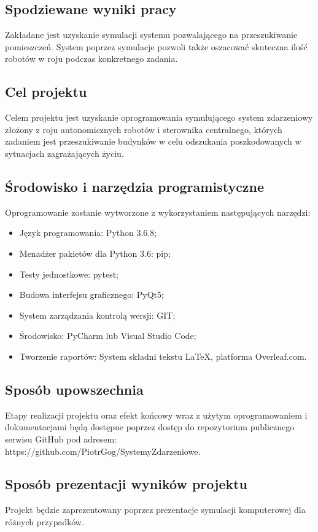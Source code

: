 \subsection{Spodziewane wyniki pracy} 
\label{subsec:spodziewane_wyniki_pracy}         
Zakładane jest uzyskanie symulacji systemu pozwalającego na przeszukiwanie pomieszczeń. System poprzez symulacje pozwoli także oszacować skuteczna ilość robotów w roju podczas konkretnego zadania.

\subsection{Cel projektu} 
\label{subsec:cel_projektu}         
Celem projektu jest uzyskanie oprogramowania symulującego system zdarzeniowy złożony z roju autonomicznych robotów i sterownika centralnego, których zadaniem jest przeszukiwanie budynków w celu odszukania poszkodowanych w sytuacjach zagrażających życiu.

\subsection{Środowisko i narzędzia programistyczne} 
\label{subsec:srodowisko_i_narzędzia_programistyczne} 
Oprogramowanie zostanie wytworzone z wykorzystaniem następujących narzędzi:
\begin{itemize}
    \item Język programowania: Python 3.6.8;
    \item Menadżer pakietów dla Python 3.6: pip;
    \item Testy jednostkowe: pytest;
    \item Budowa interfejsu graficznego: PyQt5;
    \item System zarządzania kontrolą wersji: GIT;
    \item Środowisko: PyCharm lub Visual Studio Code;
    \item Tworzenie raportów: System składni tekstu \LaTeX{}, platforma Overleaf.com.
\end{itemize}

\subsection{Sposób upowszechnia} 
\label{subsec:Sposob_upowszechnia}  
Etapy realizacji projektu oraz efekt końcowy wraz z użytym oprogramowaniem 
i dokumentacjami będą dostępne poprzez dostęp do repozytorium publicznego serwisu GitHub pod adresem:\\ https://github.com/PiotrGog/SystemyZdarzeniowe.
\subsection{Sposób prezentacji wyników projektu} 
\label{subsec:sposob_prezentacji_wyników_projektu}        
Projekt będzie zaprezentowany poprzez prezentacje symulacji komputerowej dla różnych przypadków.